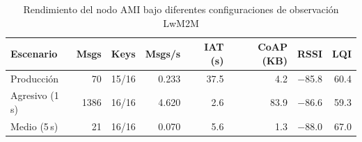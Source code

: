 \begin{table}[htbp]
\centering
\caption{Rendimiento del nodo AMI bajo diferentes configuraciones de observación LwM2M}
\label{tab:benchmark-aggregate}
\footnotesize
\begin{tabular}{lrrrrrrr}
\toprule
\textbf{Escenario} & \textbf{Msgs} & \textbf{Keys} & \textbf{Msgs/s} & \textbf{IAT (s)} & \textbf{CoAP (KB)} & \textbf{RSSI} & \textbf{LQI} \\
\midrule
Producción & 70 & 15/16 & 0.233 & 37.5 & 4.2 & $-$85.8 & 60.4 \\
Agresivo \textrm{(1\,s)} & 1386 & 16/16 & 4.620 & 2.6 & 83.9 & $-$86.6 & 59.3 \\
Medio \textrm{(5\,s)} & 21 & 16/16 & 0.070 & 5.6 & 1.3 & $-$88.0 & 67.0 \\
\bottomrule
\end{tabular}
\end{table}
